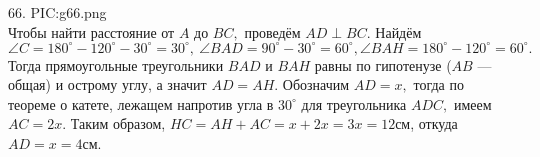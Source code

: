 66. {{PIC:g66.png}}\\
Чтобы найти расстояние от $A$ до $BC,$ проведём $AD\perp BC.$ Найдём $\angle C=180^\circ-120^\circ-30^\circ=30^\circ,\ \angle BAD=90^\circ-30^\circ=60^\circ, \angle BAH=180^\circ-120^\circ=60^\circ.$ Тогда прямоугольные треугольники $BAD$ и $BAH$ равны по гипотенузе ($AB$ --- общая) и острому углу, а значит $AD=AH.$ Обозначим $AD=x,$ тогда по теореме о катете, лежащем напротив угла в $30^\circ$ для треугольника $ADC,$ имеем $AC=2x.$ Таким образом, $HC=AH+AC=x+2x=3x=12$см, откуда $AD=x=4$см.\\

